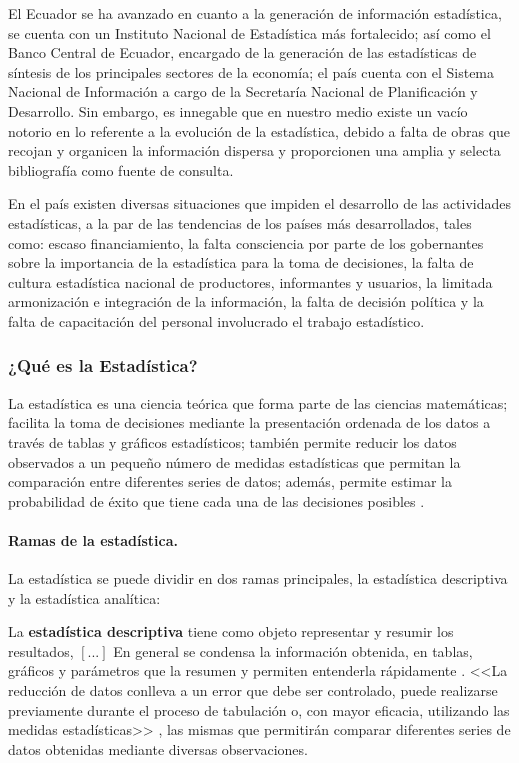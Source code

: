 \documentclass[a5paper,doc,10pt,noapacite]{apa6}
\begin{document}
{{El Ecuador se ha avanzado en cuanto a la generación de información estadística, se cuenta con un Instituto Nacional de Estadística más fortalecido; así como el Banco Central de Ecuador, encargado de la generación de las estadísticas de síntesis de los principales sectores de la economía; el país cuenta con el Sistema Nacional de Información a cargo de la Secretaría Nacional de Planificación y Desarrollo. Sin embargo, es innegable que en nuestro medio existe un vacío notorio en lo referente a la evolución de la estadística, debido a falta de obras que recojan y organicen la información dispersa y proporcionen una amplia y selecta bibliografía como fuente de consulta.

\vspace{1\baselineskip}
En el país existen diversas situaciones que impiden el desarrollo de las actividades estadísticas, a la par de las tendencias de los países más desarrollados, tales como: escaso financiamiento, la falta consciencia por parte de los gobernantes sobre la importancia de la estadística para la toma de decisiones, la falta de cultura estadística nacional de productores, informantes y usuarios, la limitada armonización e integración de la información, la falta de decisión política y la falta de capacitación del personal involucrado el trabajo estadístico.

\subsubsection{¿Qué es la Estadística?} 

La estadística es una ciencia teórica que forma parte de las ciencias matemáticas; facilita la toma de decisiones mediante la presentación ordenada de los datos a través de tablas y gráficos estadísticos; también permite reducir los datos observados a un pequeño número de medidas estadísticas que permitan la comparación entre diferentes series de datos; además, permite estimar la probabilidad de éxito que tiene cada una de las decisiones posibles \cite{Fernandez-2002}.

\paragraph{Ramas de la estadística.}

La estadística se puede dividir en dos ramas principales, la estadística descriptiva y la estadística analítica:

\vspace{1\baselineskip}
La \textbf{estadística descriptiva} tiene como objeto representar y resumir los resultados, \([...]\) En general se condensa la información obtenida, en tablas, gráficos y parámetros que la resumen y permiten entenderla rápidamente \cite{Vargas-1995}. <<La reducción de datos conlleva a un error que debe ser controlado, puede realizarse previamente durante el proceso de tabulación o, con mayor eficacia, utilizando las medidas estadísticas>> \cite{Fernandez-2002}, las mismas que permitirán comparar diferentes series de datos obtenidas mediante diversas observaciones.

}}
\end{document}
